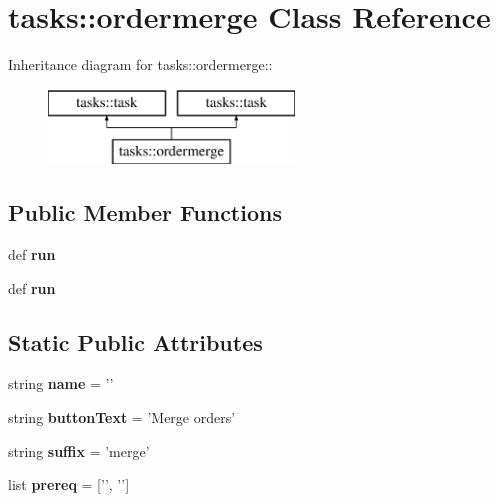 \section{tasks::ordermerge Class Reference}
\label{classtasks_1_1ordermerge}
Inheritance diagram for tasks::ordermerge::\begin{figure}[H]
\begin{center}
\leavevmode
\includegraphics[height=2cm]{classtasks_1_1ordermerge}
\end{center}
\end{figure}
\subsection*{Public Member Functions}
\begin{CompactItemize}
\item 
def \textbf{run}\label{classtasks_1_1ordermerge_735e8002c7420e551a051304d39ecce7}

\item 
def \textbf{run}\label{classtasks_1_1ordermerge_735e8002c7420e551a051304d39ecce7}

\end{CompactItemize}
\subsection*{Static Public Attributes}
\begin{CompactItemize}
\item 
string \textbf{name} = '{\bfordermerge}'\label{classtasks_1_1ordermerge_38bb09d69dd62d1cfbcb3846e7a9363e}

\item 
string \textbf{button\-Text} = 'Merge orders'\label{classtasks_1_1ordermerge_70658f63557c39e40122709254557c0c}

\item 
string \textbf{suffix} = 'merge'\label{classtasks_1_1ordermerge_22921dd8fc1f820c81b37205ab9a0a7d}

\item 
list \textbf{prereq} = ['{\bfblazecorr}', '{\bfaddwave}']\label{classtasks_1_1ordermerge_ab46b0b2a63158eb3cca9d547c775852}

\end{CompactItemize}


